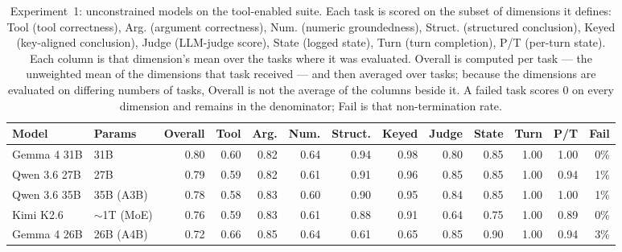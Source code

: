 \begin{table}[!t]
\centering
\caption{Experiment~1: unconstrained models on the tool-enabled suite. Each task is scored on the subset of dimensions it defines: Tool (tool correctness), Arg. (argument correctness), Num. (numeric groundedness), Struct. (structured conclusion), Keyed (key-aligned conclusion), Judge (LLM-judge score), State (logged state), Turn (turn completion), P/T (per-turn state). Each column is that dimension's mean over the tasks where it was evaluated. Overall is computed per task --- the unweighted mean of the dimensions that task received --- and then averaged over tasks; because the dimensions are evaluated on differing numbers of tasks, Overall is not the average of the columns beside it. A failed task scores 0 on every dimension and remains in the denominator; Fail is that non-termination rate.}
\label{tab:exp1}
\small
\setlength{\tabcolsep}{4pt}
\begin{tabular}{@{}ll rrrrrrrrrrr@{}}
\toprule
Model & Params & Overall & Tool & Arg. & Num. & Struct. & Keyed & Judge & State & Turn & P/T & Fail \\
\midrule
Gemma 4 31B & 31B & 0.80 & 0.60 & 0.82 & 0.64 & 0.94 & 0.98 & 0.80 & 0.85 & 1.00 & 1.00 & 0\% \\
Qwen 3.6 27B & 27B & 0.79 & 0.59 & 0.82 & 0.61 & 0.91 & 0.96 & 0.85 & 0.85 & 1.00 & 0.94 & 1\% \\
Qwen 3.6 35B & 35B (A3B) & 0.78 & 0.58 & 0.83 & 0.60 & 0.90 & 0.95 & 0.84 & 0.85 & 1.00 & 1.00 & 1\% \\
Kimi K2.6 & $\sim$1T (MoE) & 0.76 & 0.59 & 0.83 & 0.61 & 0.88 & 0.91 & 0.64 & 0.75 & 1.00 & 0.89 & 0\% \\
Gemma 4 26B & 26B (A4B) & 0.72 & 0.66 & 0.85 & 0.64 & 0.61 & 0.65 & 0.85 & 0.90 & 1.00 & 0.94 & 3\% \\
\bottomrule
\end{tabular}
\end{table}
